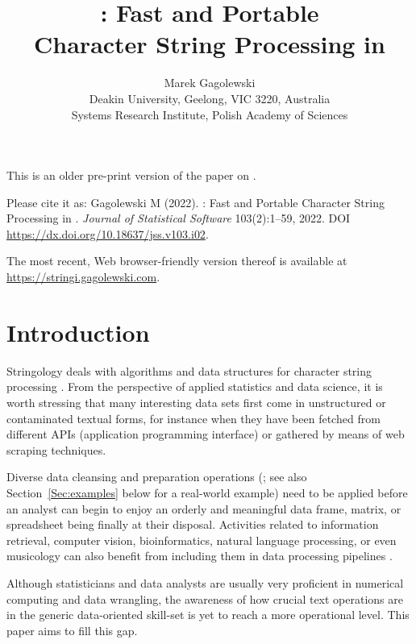 \documentclass[nojss]{jss}\usepackage[]{graphicx}\usepackage[]{xcolor}
\author{Marek Gagolewski\\
Deakin University, Geelong, VIC 3220, Australia\\
Systems Research Institute, Polish Academy of Sciences
}
\title{\pkg{stringi}: Fast and Portable\\Character String
Processing in \proglang{R}}
\begin{document}
{\color{blue}
This is an older pre-print version of the paper on .

Please cite it as:
Gagolewski M (2022).
: Fast and Portable Character String Processing in .
\textit{Journal of Statistical Software} 103(2):1--59, 2022.
DOI \url{https://dx.doi.org/10.18637/jss.v103.i02}.

The most recent, Web browser-friendly version thereof
is available at \url{https://stringi.gagolewski.com}.
}







\section{Introduction}\label{Sec:intro}

Stringology \citep{stringology} deals with algorithms and data structures
for character string processing \citep{speechlangproc,szpankowski}.
From the perspective of applied statistics and data science,
it is worth stressing that many interesting data sets
first come in unstructured or contaminated textual forms,
for instance when they have been fetched from different APIs
(application programming interface) or gathered
by means of web scraping techniques.

Diverse data cleansing and preparation operations
(\citealp{datacleaning,cleanr}; see also
Section~\ref{Sec:examples} below for a real-world example)
need to be applied before an analyst can begin to enjoy
an orderly and meaningful data frame, matrix, or spreadsheet being finally
at their disposal.
Activities related to information retrieval, computer vision,
bioinformatics, natural language processing, or even musicology
can also benefit from including them
in data processing pipelines \citep{speechlangproc,genome}.


Although statisticians and data analysts are usually
very proficient in numerical computing and data wrangling,
the awareness of how crucial text operations are in the generic
data-oriented skill-set is yet to reach a more operational
level. This paper aims to fill this gap.
\end{document}
